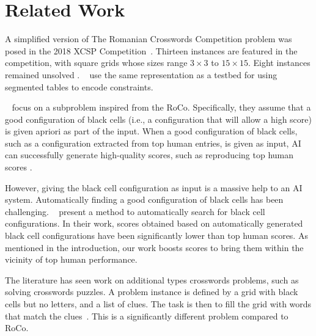 \section{Related Work}
\label{sec::relwork}

A simplified version of The Romanian Crosswords Competition problem was posed
in the 2018 XCSP Competition~\cite{DBLP:journals/corr/abs-1901-01830}.
Thirteen instances are featured in the competition, 
with square grids whose sizes range $3 \times 3$ to $15 \times 15$.
Eight instances remained unsolved \cite{DBLP:journals/corr/abs-1901-01830}.
\citeauthor{DBLP:conf/ecai/AudemardLM20}~
use the same representation
as a testbed for using segmented tables
to encode constraints.

\citeauthor{DBLP:conf/socs/BoteaB21}~
focus on a subproblem inspired from the {\sc RoCo}.
Specifically, they assume that 
a good configuration of black cells 
(i.e., a configuration that will allow a high score)
is given apriori as part of the input.
When a good configuration of black cells,
such as a configuration extracted from top human entries,
is given as input, AI can successfully generate high-quality scores,
such as reproducing top human scores \cite{DBLP:conf/socs/BoteaB21}.

However, giving the black cell configuration as input is a massive help to an AI system.
Automatically finding a good configuration of black cells
has been challenging. 
\citeauthor{DBLP:conf/cig/BulitkoB21}~
present a method to automatically search for black cell configurations.
In their work, scores obtained based on automatically generated
black cell configurations have been significantly lower than 
top human scores.
As mentioned in the introduction, our work boosts scores
to bring them within the vicinity of top human performance.


The literature has seen work on additional types crosswords problems,
such as solving crosswords puzzles.
A problem instance is defined by a grid with black cells but no letters,
and a list of clues.
The task is then to fill the grid with words that match the 
clues~\cite{DBLP:journals/ai/LittmanKS02,DBLP:conf/aaai/ErnandesAG05,DBLP:journals/jair/Ginsberg11,Chen-icaps22}.
This is a significantly different problem compared to {\sc RoCo}.


\begin{comment}
The problem of \emph{crosswords grid generation} takes as input
a list of words and
a grid with only black cells.
The task is to fill the grid with words from the
list~\cite{MAZLACK19761,10.5555/1865499.1865531,botea-modref07,anbulagan-botea-cp08}.
As mentioned in the introduction and in Section~\ref{sec::background}, {\sc Roco}
is a significant generalization of the standard crosswords grid generation.
\end{comment}